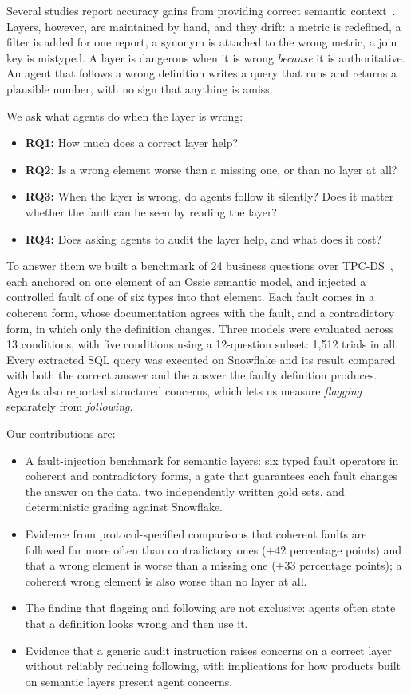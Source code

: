 \documentclass[conference]{IEEEtran}
\begin{document}
Several studies report accuracy gains from providing correct semantic context~\cite{rumiantsau2026,kim2026quvi,pillai2026ground,lee2026}. Layers, however, are maintained by hand, and they drift: a metric is redefined, a filter is added for one report, a synonym is attached to the wrong metric, a join key is mistyped. A layer is dangerous when it is wrong \emph{because} it is authoritative. An agent that follows a wrong definition writes a query that runs and returns a plausible number, with no sign that anything is amiss.

We ask what agents do when the layer is wrong:
\begin{itemize}
\item \textbf{RQ1:} How much does a correct layer help?
\item \textbf{RQ2:} Is a wrong element worse than a missing one, or than no layer at all?
\item \textbf{RQ3:} When the layer is wrong, do agents follow it silently? Does it matter whether the fault can be seen by reading the layer?
\item \textbf{RQ4:} Does asking agents to audit the layer help, and what does it cost?
\end{itemize}

To answer them we built a benchmark of 24 business questions over TPC-DS~\cite{tpcds}, each anchored on one element of an Ossie semantic model, and injected a controlled fault of one of six types into that element. Each fault comes in a coherent form, whose documentation agrees with the fault, and a contradictory form, in which only the definition changes. Three models were evaluated across 13 conditions, with five conditions using a 12-question subset: 1,512 trials in all. Every extracted SQL query was executed on Snowflake and its result compared with both the correct answer and the answer the faulty definition produces. Agents also reported structured concerns, which lets us measure \emph{flagging} separately from \emph{following}.

Our contributions are:
\begin{itemize}
\item A fault-injection benchmark for semantic layers: six typed fault operators in coherent and contradictory forms, a gate that guarantees each fault changes the answer on the data, two independently written gold sets, and deterministic grading against Snowflake.
\item Evidence from protocol-specified comparisons that coherent faults are followed far more often than contradictory ones ($+42$ percentage points) and that a wrong element is worse than a missing one ($+33$ percentage points); a coherent wrong element is also worse than no layer at all.
\item The finding that flagging and following are not exclusive: agents often state that a definition looks wrong and then use it.
\item Evidence that a generic audit instruction raises concerns on a correct layer without reliably reducing following, with implications for how products built on semantic layers present agent concerns.
\end{itemize}
\end{document}

